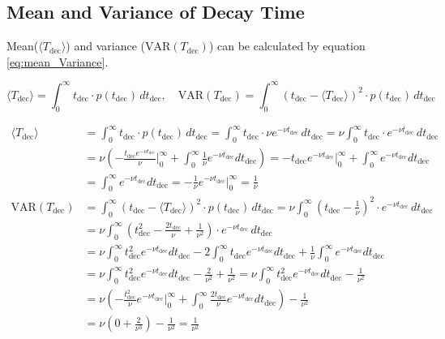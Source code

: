 \subsection{Mean and Variance of Decay Time}
Mean($\langle T_{\text{dec}} \rangle$) and variance ($\text{VAR}(T_{\text{dec}})$) can be 
calculated by equation \ref{eq:mean_Variance}.

\begin{equation}
    \langle T_{\text{dec}} \rangle = \int_{0}^{\infty} t_{\text{dec}} \cdot p(t_{\text{dec}}) \, dt_{\text{dec}}, \quad
    \text{VAR}(T_{\text{dec}}) = \int_{0}^{\infty} (t_{\text{dec}} - \langle T_{\text{dec}} \rangle)^2 \cdot p(t_{\text{dec}}) \, dt_{\text{dec}}
    \label{eq:mean_Variance}
\end{equation}

\begin{align*}
    \langle T_{\text{dec}} \rangle &= \int_{0}^{\infty} t_{\text{dec}} \cdot p(t_{\text{dec}}) \, dt _{\text{dec}}
    = \int_{0}^{\infty} t_{\text{dec}} \cdot \nu e^{-\nu t_{\text{dec}}} \, dt_{\text{dec}}
    = \nu \int_{0}^{\infty} t_{\text{dec}} \cdot e^{-\nu t_{\text{dec}}} \, dt_{\text{dec}}\\
    &= \nu(- \frac{t_{\text{dec}} e^{-\nu t_{\text{dec}}}}{\nu} \bigg|_0^{\infty} + \int_{0}^{\infty} \frac{1}{\nu} e^{-\nu t_{\text{dec}}} dt_{\text{dec}})
    = - t_{\text{dec}} e^{-\nu t_{\text{dec}}} \bigg|_0^{\infty} + \int_{0}^{\infty} e^{-\nu t_{\text{dec}}} dt_{\text{dec}}\\
    &= \int_{0}^{\infty} e^{-\nu t_{\text{dec}}} dt_{\text{dec}} = -\frac{1}{\nu} e^{-\nu t_{\text{dec}}}\bigg|_0^{\infty}=\frac{1}{\nu}\\
    \text{VAR}(T_{\text{dec}}) &= \int_{0}^{\infty} (t_{\text{dec}} - \langle T_{\text{dec}} \rangle)^2 \cdot p(t_{\text{dec}}) \, dt_{\text{dec}}
    = \nu \int_{0}^{\infty} (t_{\text{dec}} - \frac{1}{\nu})^2 \cdot e^{-\nu t_{\text{dec}}} \, dt_{\text{dec}}\\
    &= \nu \int_{0}^{\infty} (t_{\text{dec}}^2 - \frac{2 t_{\text{dec}}}{\nu} + \frac{1}{\nu^2}) \cdot e^{-\nu t_{\text{dec}}} \, dt_{\text{dec}}\\
    &= \nu \int_{0}^{\infty} t_{\text{dec}}^2 e^{-\nu t_{\text{dec}}} dt_{\text{dec}} - 2 \int_{0}^{\infty} {t_{\text{dec}}}  e^{-\nu t_{\text{dec}}} dt_{\text{dec}} + \frac{1}{\nu} \int_{0}^{\infty} e^{-\nu t_{\text{dec}}} dt_{\text{dec}}\\
    &= \nu \int_{0}^{\infty} t_{\text{dec}}^2 e^{-\nu t_{\text{dec}}} dt_{\text{dec}} - \frac{2}{\nu^2} + \frac{1}{\nu^2}
    = \nu \int_{0}^{\infty} t_{\text{dec}}^2 e^{-\nu t_{\text{dec}}} dt_{\text{dec}} - \frac{1}{\nu^2}\\
    &=\nu\left( - \frac{t_{\text{dec}}^2}{\nu} e^{-\nu t_{\text{dec}}} \bigg|_{0}^{\infty} + \int_{0}^{\infty} \frac{2t_{\text{dec}}}{\nu} e^{-\nu t_{\text{dec}}} dt_{\text{dec}} \right)- \frac{1}{\nu^2}\\
    &= \nu \left(0 +  \frac{2}{\nu^3} \right) - \frac{1}{\nu^2} = \frac{1}{\nu^2}
\end{align*}

